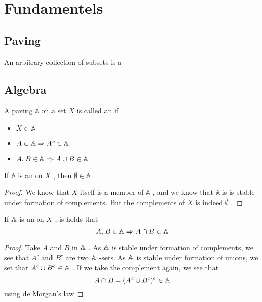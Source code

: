 \section{Fundamentels}

\subsection{Paving}

An arbitrary collection of subsets is a  

\subsection{Algebra}
\begin{defn}
A paving \(\mathbb{A}\)  on a set \(X\)  is called an  
if

\begin{itemize}
  \item \(X\in\mathbb{A}\)
  \item \(A\in\mathbb{A}\Rightarrow A^{c}\in{\mathbb{A}}\)
  \item \(A,B\in\mathbb{A}\Rightarrow A\cup B\in{\mathbb{A}}\)
\end{itemize}
\end{defn}
\begin{lem}

If \(\mathbb{A}\)  is an  on \(X\) , then \(\emptyset\in\mathbb{A}\) \end{lem}

\begin{proof}
We know that \(X\)  itself is a member of \(\mathbb{A}\) , and we know that \(\mathbb{A}\)  is is stable under formation of complements. But the complements of \(X\)  is indeed \(\emptyset\) .
\end{proof}

\begin{lem}
If \({\mathbb{A}}\)  is an  on \(X\) , is holds that
\[
A,B\in{\mathbb{A}}\Rightarrow A\cap B\in{\mathbb{A}}
\]
\end{lem}

\begin{proof}
Take \(A\)  and \(B\)  in \({\mathbb{A}}\) . As \({\mathbb{A}}\)  is stable under formation of complements, we see that \(A^{c}\)  and \(B^{c}\)  are two \({\mathbb{A}}\) -sets. As \({\mathbb{A}}\)  is stable under formation of unions, we set that \(A^{c}\cup B^{c}\in{\mathbb{A}}\) . If we take the complement again, we see that
\[
  A\cap B=(A^{c}\cup B^{c})^{c}\in{\mathbb{A}}
\]
using {de Morgan's law}
\end{proof}

